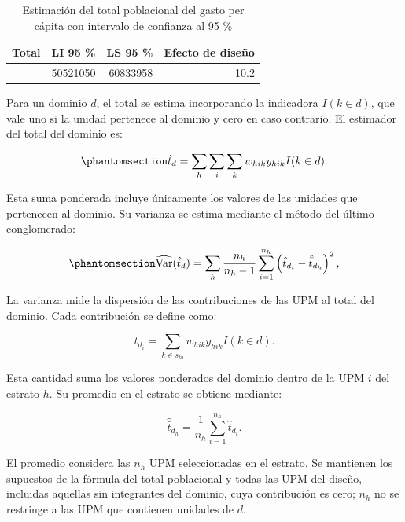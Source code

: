 \documentclass[
  spanish,
  11pt,
  letterpaper,
  oneside,
  open=any]{scrbook}
\begin{document}
{

\begin{longtable}[]{@{}rrrr@{}}

\caption{\label{tbl-total-gasto}Estimación del total poblacional del
gasto per cápita con intervalo de confianza al 95 \%}

\tabularnewline

\toprule\noalign{}
Total & LI 95 \% & LS 95 \% & Efecto de diseño \\
\midrule\noalign{}
\endhead
\bottomrule\noalign{}
\endlastfoot
55677504 & 50521050 & 60833958 & 10.2 \\

\end{longtable}

}

Para un dominio \(d\), el total se estima incorporando la indicadora
\(I(k\in d)\), que vale uno si la unidad pertenece al dominio y cero en
caso contrario. El estimador del total del dominio es:

\begin{equation}\protect\phantomsection\label{eq-total-dominio}{
\hat{t}_d=\sum_h\sum_i\sum_k w_{hik}y_{hik}I(k\in d).
}\end{equation}

Esta suma ponderada incluye únicamente los valores de las unidades que
pertenecen al dominio. Su varianza se estima mediante el método del
último conglomerado:

\begin{equation}\protect\phantomsection\label{eq-varianza-total-dominio}{
\widehat{\operatorname{Var}}(\hat{t}_d)
=\sum_h\frac{n_h}{n_h-1}\sum_{i=1}^{n_h}
\left(\hat{t}_{d_i}-\hat{\bar{t}}_{d_h}\right)^2,
}\end{equation}

La varianza mide la dispersión de las contribuciones de las UPM al total
del dominio. Cada contribución se define como:

\[
\hat{t}_{d_i}=\sum_{k\in s_{hi}}w_{hik}y_{hik}I(k\in d).
\]

Esta cantidad suma los valores ponderados del dominio dentro de la UPM
\(i\) del estrato \(h\). Su promedio en el estrato se obtiene mediante:

\[
\hat{\bar{t}}_{d_h}=\frac{1}{n_h}\sum_{i=1}^{n_h}\hat{t}_{d_i}.
\]

El promedio considera las \(n_h\) UPM seleccionadas en el estrato. Se
mantienen los supuestos de la fórmula del total poblacional y todas las
UPM del diseño, incluidas aquellas sin integrantes del dominio, cuya
contribución es cero; \(n_h\) no se restringe a las UPM que contienen
unidades de \(d\).
\end{document}

